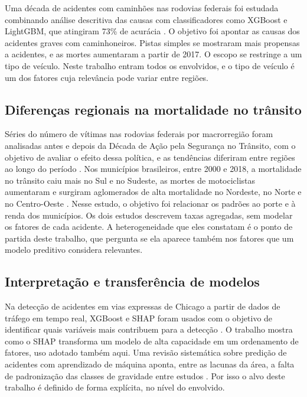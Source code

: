\documentclass[12pt]{article}
\begin{document}
Uma década de acidentes com caminhões nas rodovias federais foi
estudada combinando análise descritiva das causas com classificadores
como XGBoost e LightGBM, que atingiram 73\% de acurácia
\cite{soliani2024}. O objetivo foi apontar as causas dos acidentes
graves com caminhoneiros. Pistas simples se mostraram mais propensas a
acidentes, e as mortes aumentaram a partir de 2017. O escopo se
restringe a um tipo de veículo. Neste trabalho entram todos os
envolvidos, e o tipo de veículo é um dos fatores cuja relevância pode
variar entre regiões.

\subsection{Diferenças regionais na mortalidade no trânsito}

Séries do número de vítimas nas rodovias federais por macrorregião
foram analisadas antes e depois da Década de Ação pela Segurança no
Trânsito, com o objetivo de avaliar o efeito dessa política, e as
tendências diferiram entre regiões ao longo do período
\cite{andrade2019}. Nos municípios brasileiros, entre 2000 e 2018, a
mortalidade no trânsito caiu mais no Sul e no Sudeste, as mortes de
motociclistas aumentaram e surgiram aglomerados de alta mortalidade no
Nordeste, no Norte e no Centro-Oeste \cite{malta2023}. Nesse estudo, o
objetivo foi relacionar os padrões ao porte e à renda dos municípios.
Os dois estudos descrevem taxas agregadas, sem modelar os fatores de
cada acidente. A heterogeneidade que eles constatam é o ponto de partida
deste trabalho, que pergunta se ela aparece também nos fatores que um
modelo preditivo considera relevantes.

\subsection{Interpretação e transferência de modelos}

Na detecção de acidentes em vias expressas de Chicago a partir de dados
de tráfego em tempo real, XGBoost e SHAP foram usados com o objetivo de
identificar quais variáveis mais contribuem para a detecção
\cite{parsa2020}. O trabalho mostra como o SHAP transforma um modelo de
alta capacidade em um ordenamento de fatores, uso adotado também aqui.
Uma revisão sistemática sobre predição de acidentes com aprendizado de
máquina aponta, entre as lacunas da área, a falta de padronização das
classes de gravidade entre estudos \cite{ali2024}. Por isso o alvo deste
trabalho é definido de forma explícita, no nível do envolvido.
\end{document}
